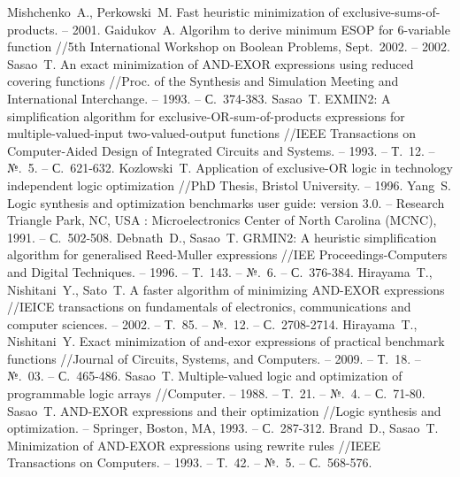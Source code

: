 \documentclass[a4paper,12pt,titlepage,finall]{article}
\begin{document}
\begin{raggedright}
\begin{thebibliography}{99}
     Mishchenko~A., Perkowski~M. Fast heuristic minimization of exclusive-sums-of-products. – 2001.
     Gaidukov~A. Algorihm to derive minimum ESOP for 6-variable function //5th International Workshop on Boolean Problems, Sept.~2002. – 2002.
     Sasao~T. An exact minimization of AND-EXOR expressions using reduced covering functions //Proc. of the Synthesis and Simulation Meeting and International Interchange. – 1993. – С.~374-383.
     Sasao~T. EXMIN2: A simplification algorithm for exclusive-OR-sum-of-products expressions for multiple-valued-input two-valued-output functions //IEEE Transactions on Computer-Aided Design of Integrated Circuits and Systems. – 1993. – Т.~12. – №.~5. – С.~621-632.
     Kozlowski~T. Application of exclusive-OR logic in technology independent logic optimization //PhD Thesis, Bristol University. – 1996.
     Yang~S. Logic synthesis and optimization benchmarks user guide: version 3.0. – Research Triangle Park, NC, USA : Microelectronics Center of North Carolina (MCNC), 1991. – С.~502-508.
     Debnath~D., Sasao~T. GRMIN2: A heuristic simplification algorithm for generalised Reed-Muller expressions //IEE Proceedings-Computers and Digital Techniques. – 1996. – Т.~143. – №.~6. – С.~376-384.
     Hirayama~T., Nishitani~Y., Sato~T. A faster algorithm of minimizing AND-EXOR expressions //IEICE transactions on fundamentals of electronics, communications and computer sciences. – 2002. – Т.~85. – №.~12. – С.~2708-2714.
     Hirayama~T., Nishitani~Y. Exact minimization of and-exor expressions of practical benchmark functions //Journal of Circuits, Systems, and Computers. – 2009. – Т.~18. – №.~03. – С.~465-486.
     Sasao~T. Multiple-valued logic and optimization of programmable logic arrays //Computer. – 1988. – Т.~21. – №.~4. – С.~71-80.
     Sasao~T. AND-EXOR expressions and their optimization //Logic synthesis and optimization. – Springer, Boston, MA, 1993. – С.~287-312.
     Brand~D., Sasao~T. Minimization of AND-EXOR expressions using rewrite rules //IEEE Transactions on Computers. – 1993. – Т.~42. – №.~5. – С.~568-576.
\end{thebibliography}
\end{raggedright}
\end{document}
